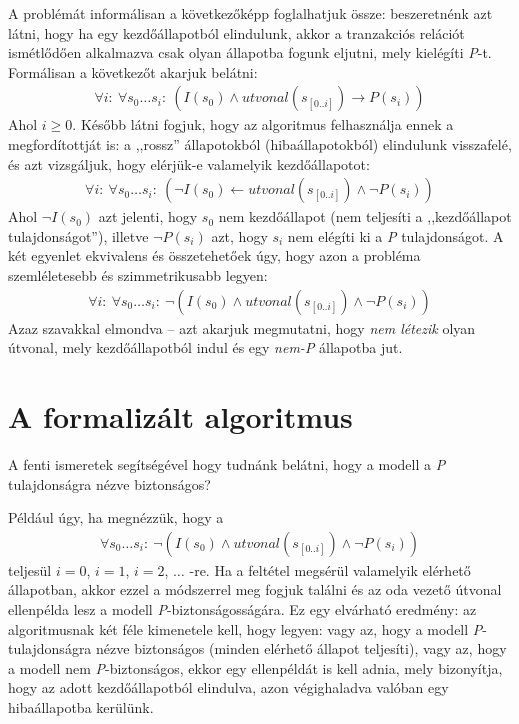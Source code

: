 A problémát informálisan a következőképp foglalhatjuk össze: beszeretnénk azt látni, hogy ha egy kezdőállapotból elindulunk, akkor a tranzakciós relációt ismétlődően alkalmazva csak olyan állapotba fogunk eljutni, mely kielégíti \emph{P}-t. Formálisan a következőt akarjuk belátni:
\begin{align}
	\forall i:~\forall s_{0} \dots s_{i}:~(I(s_{0}) \wedge utvonal(s_{[0..i]}) \rightarrow P(s_{i}))
\end{align}
Ahol $i \geq 0$. Később látni fogjuk, hogy az algoritmus felhasználja ennek a megfordítottját is: a ,,rossz'' állapotokból (hibaállapotokból) elindulunk visszafelé, és azt vizsgáljuk, hogy elérjük-e valamelyik kezdőállapotot:
\begin{align}
	\forall i:~\forall s_{0} \dots s_{i}:~(\neg I(s_{0}) \leftarrow utvonal(s_{[0..i]}) \wedge \neg P(s_{i}))
\end{align}
Ahol $\neg I(s_{0})$ azt jelenti, hogy $s_{0}$ nem kezdőállapot (nem teljesíti a ,,kezdőállapot tulajdonságot''), illetve $\neg P(s_{i})$ azt, hogy $s_{i}$ nem elégíti ki a \emph{P} tulajdonságot. A két egyenlet ekvivalens és összetehetőek úgy, hogy azon a probléma szemléletesebb és szimmetrikusabb legyen:
\begin{align}
	\forall i:~\forall s_{0} \dots s_{i}:~\neg(I(s_{0}) \wedge utvonal(s_{[0..i]}) \wedge \neg P(s_{i}))
\end{align}
Azaz szavakkal elmondva -- azt akarjuk megmutatni, hogy \emph{nem létezik} olyan útvonal, mely kezdőállapotból indul és egy \emph{nem-P} állapotba jut.

\section{A formalizált algoritmus}

A fenti ismeretek segítségével hogy tudnánk belátni, hogy a modell a \emph{P} tulajdonságra nézve biztonságos?

Például úgy, ha megnézzük, hogy a 
\begin{align}
	\forall s_{0} \dots s_{i}:~\neg(I(s_{0}) \wedge utvonal(s_{[0..i]}) \wedge \neg P(s_{i}))
\end{align}
teljesül $i = 0$, $i = 1$, $i = 2$, $\dots$ -re. Ha a feltétel megsérül valamelyik elérhető állapotban, akkor ezzel a módszerrel meg fogjuk találni és az oda vezető útvonal ellenpélda lesz a modell \emph{P}-biztonságosságára. Ez egy elvárható eredmény: az algoritmusnak két féle kimenetele kell, hogy legyen: vagy az, hogy a modell \emph{P}-tulajdonságra nézve biztonságos (minden elérhető állapot teljesíti), vagy az, hogy a modell nem \emph{P}-biztonságos, ekkor egy ellenpéldát is kell adnia, mely bizonyítja, hogy az adott kezdőállapotból elindulva, azon végighaladva valóban egy hibaállapotba kerülünk.

